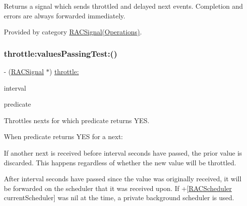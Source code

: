 Returns a signal which sends throttled and delayed {\ttfamily next} events. Completion and errors are always forwarded immediately. 

Provided by category \mbox{\hyperlink{category_r_a_c_signal_07_operations_08_a2542ae804d05ec734d0f4d2fa8c3ac93}{R\+A\+C\+Signal(\+Operations)}}.

\mbox{\label{interface_r_a_c_signal_a0310fbee83b4ca1b1daca25daf24f41b}} 
\subsubsection{\texorpdfstring{throttle\+:values\+Passing\+Test\+:()}{throttle:valuesPassingTest:()}\hspace{0.1cm}{\footnotesize\ttfamily [1/3]}}
{\footnotesize\ttfamily -\/ (\mbox{\hyperlink{interface_r_a_c_signal}{R\+A\+C\+Signal}} $\ast$) \mbox{\hyperlink{category_r_a_c_signal_07_operations_08_a2542ae804d05ec734d0f4d2fa8c3ac93}{throttle\+:}} \begin{DoxyParamCaption}\item[{(N\+S\+Time\+Interval)}]{interval }\item[{valuesPassingTest:(B\+O\+OL($^\wedge$)(id next))}]{predicate }\end{DoxyParamCaption}}

Throttles {\ttfamily next}s for which {\ttfamily predicate} returns Y\+ES.

When {\ttfamily predicate} returns Y\+ES for a {\ttfamily next}\+:


\begin{DoxyEnumerate}
\item If another {\ttfamily next} is received before {\ttfamily interval} seconds have passed, the prior value is discarded. This happens regardless of whether the new value will be throttled.
\item After {\ttfamily interval} seconds have passed since the value was originally received, it will be forwarded on the scheduler that it was received upon. If +\mbox{[}\mbox{\hyperlink{interface_r_a_c_scheduler}{R\+A\+C\+Scheduler}} current\+Scheduler\mbox{]} was nil at the time, a private background scheduler is used.
\end{DoxyEnumerate}

